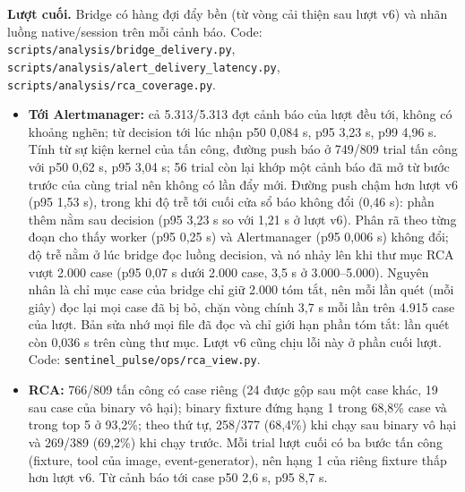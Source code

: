 \textbf{Lượt cuối.} Bridge có hàng đợi đẩy bền (từ vòng cải thiện sau lượt v6) và nhãn luồng native/session trên mỗi cảnh báo. Code: \texttt{scripts/\allowbreak{}analysis/\allowbreak{}bridge\_\allowbreak{}delivery.py}, \texttt{scripts/\allowbreak{}analysis/\allowbreak{}alert\_\allowbreak{}delivery\_\allowbreak{}latency.py}, \texttt{scripts/\allowbreak{}analysis/\allowbreak{}rca\_\allowbreak{}coverage.py}.
\begin{itemize}
\tightlist
\item
  \textbf{Tới Alertmanager:} cả 5.313/5.313 đợt cảnh báo của lượt đều tới, không có khoảng nghẽn; từ decision tới lúc nhận p50 0,084 s, p95 3,23 s, p99 4,96 s. Tính từ sự kiện kernel của tấn công, đường push báo ở 749/809 trial tấn công với p50 0,62 s, p95 3,04 s; 56 trial còn lại khớp một cảnh báo đã mở từ bước trước của cùng trial nên không có lần đẩy mới. Đường push chậm hơn lượt v6 (p95 1,53 s), trong khi độ trễ tới cuối cửa sổ báo không đổi (0,46 s): phần thêm nằm sau decision (p95 3,23 s so với 1,21 s ở lượt v6). Phân rã theo từng đoạn cho thấy worker (p95 0,25 s) và Alertmanager (p95 0,006 s) không đổi; độ trễ nằm ở lúc bridge đọc luồng decision, và nó nhảy lên khi thư mục RCA vượt 2.000 case (p95 0,07 s dưới 2.000 case, 3,5 s ở 3.000--5.000). Nguyên nhân là chỉ mục case của bridge chỉ giữ 2.000 tóm tắt, nên mỗi lần quét (mỗi giây) đọc lại mọi case đã bị bỏ, chặn vòng chính 3,7 s mỗi lần trên 4.915 case của lượt. Bản sửa nhớ mọi file đã đọc và chỉ giới hạn phần tóm tắt: lần quét còn 0,036 s trên cùng thư mục. Lượt v6 cũng chịu lỗi này ở phần cuối lượt. Code: \texttt{sentinel\_\allowbreak{}pulse/\allowbreak{}ops/\allowbreak{}rca\_\allowbreak{}view.py}.
\item
  \textbf{RCA:} 766/809 tấn công có case riêng (24 được gộp sau một case khác, 19 sau case của binary vô hại); binary fixture đứng hạng 1 trong 68,8\% case và trong top 5 ở 93,2\%; theo thứ tự, 258/377 (68,4\%) khi chạy sau binary vô hại và 269/389 (69,2\%) khi chạy trước. Mỗi trial lượt cuối có ba bước tấn công (fixture, tool của image, event-generator), nên hạng 1 của riêng fixture thấp hơn lượt v6. Từ cảnh báo tới case p50 2,6 s, p95 8,7 s.
\end{itemize}
